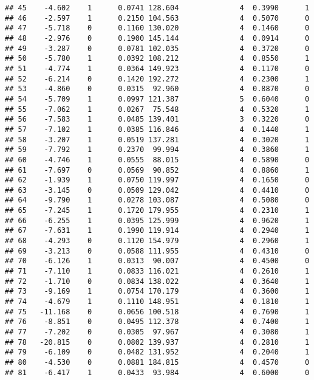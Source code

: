 \documentclass[
]{article}
\begin{document}
\begin{verbatim}
## 45    -4.602    1      0.0741 128.604              4  0.3990      1
## 46    -2.597    1      0.2150 104.563              4  0.5070      0
## 47    -5.718    0      0.1160 130.020              4  0.1460      0
## 48    -2.976    0      0.1900 145.144              4  0.0914      0
## 49    -3.287    0      0.0781 102.035              4  0.3720      0
## 50    -5.780    1      0.0392 108.212              4  0.8550      1
## 51    -4.774    1      0.0364 149.923              4  0.1170      0
## 52    -6.214    0      0.1420 192.272              4  0.2300      1
## 53    -4.860    0      0.0315  92.960              4  0.8870      0
## 54    -5.709    1      0.0997 121.387              5  0.6040      0
## 55    -7.062    1      0.0267  75.548              4  0.5320      1
## 56    -7.583    1      0.0485 139.401              3  0.3220      0
## 57    -7.102    1      0.0385 116.846              4  0.1440      1
## 58    -3.207    1      0.0519 137.281              4  0.3020      1
## 59    -7.792    1      0.2370  99.994              4  0.3860      1
## 60    -4.746    1      0.0555  88.015              4  0.5890      0
## 61    -7.697    0      0.0569  90.852              4  0.8860      1
## 62    -1.939    1      0.0750 119.997              4  0.1650      0
## 63    -3.145    0      0.0509 129.042              4  0.4410      0
## 64    -9.790    1      0.0278 103.087              4  0.5080      0
## 65    -7.245    1      0.1720 179.955              4  0.2310      1
## 66    -6.255    1      0.0395 125.999              4  0.9620      1
## 67    -7.631    1      0.1990 119.914              4  0.2940      1
## 68    -4.293    0      0.1120 154.979              4  0.2960      1
## 69    -3.213    0      0.0588 111.955              4  0.4310      0
## 70    -6.126    1      0.0313  90.007              4  0.4500      0
## 71    -7.110    1      0.0833 116.021              4  0.2610      1
## 72    -1.710    0      0.0834 138.022              4  0.3640      1
## 73    -9.169    1      0.0754 170.179              4  0.3600      1
## 74    -4.679    1      0.1110 148.951              4  0.1810      1
## 75   -11.168    0      0.0656 100.518              4  0.7690      1
## 76    -8.851    0      0.0495 112.378              4  0.7400      1
## 77    -7.202    0      0.0305  97.967              4  0.3080      1
## 78   -20.815    0      0.0802 139.937              4  0.2810      1
## 79    -6.109    0      0.0482 131.952              4  0.2040      1
## 80    -4.530    0      0.0881 184.815              4  0.4570      0
## 81    -6.417    1      0.0433  93.984              4  0.6000      0

\end{verbatim}
\end{document}
